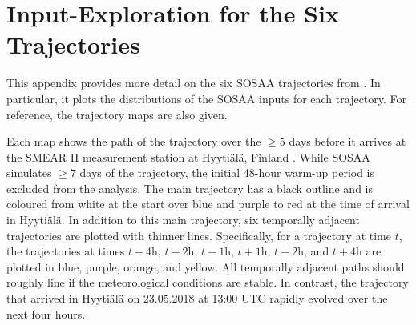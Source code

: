 \chapter{Input-Exploration for the Six Trajectories} \label{app:six-trajectories}

This appendix provides more detail on the six SOSAA trajectories from . In particular, it plots the distributions of the SOSAA inputs for each trajectory. For reference, the trajectory maps are also given.

Each map shows the path of the trajectory over the $\geq 5$ days before it arrives at the SMEAR II measurement station at Hyyti\"al\"a, Finland \cite{smear-station-2013}. While SOSAA simulates $\geq 7$ days of the trajectory, the initial 48-hour warm-up period is excluded from the analysis. The main trajectory has a black outline and is coloured from white at the start over blue and purple to red at the time of arrival in Hyyti\"al\"a. In addition to this main trajectory, six temporally adjacent trajectories are plotted with thinner lines. Specifically, for a trajectory at time $t$, the trajectories at times $t-4\text{h}$, $t-2\text{h}$, $t-1\text{h}$, $t+1\text{h}$, $t+2\text{h}$, and $t+4\text{h}$ are plotted in blue, purple, orange, and yellow. All temporally adjacent paths should roughly line if the meteorological conditions are stable. In contrast, the trajectory that arrived in Hyyti\"al\"a on 23.05.2018 at 13:00 UTC rapidly evolved over the next four hours.

